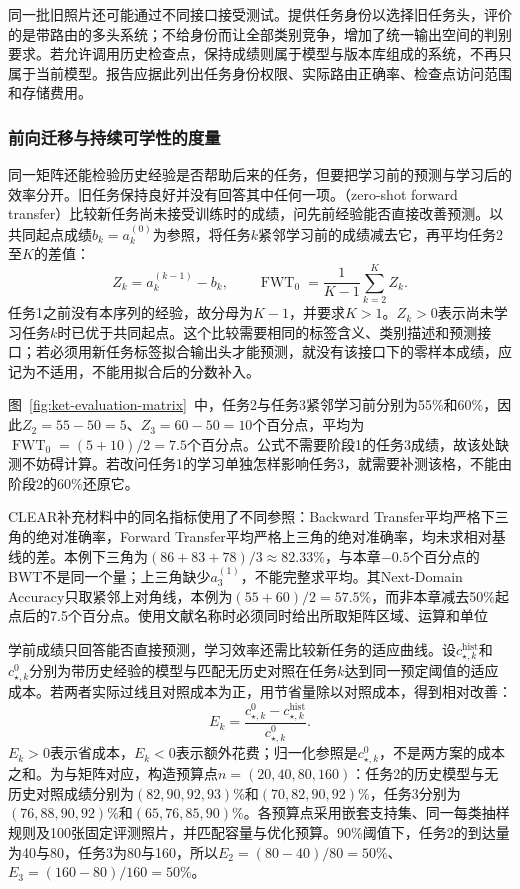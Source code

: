 同一批旧照片还可能通过不同接口接受测试。提供任务身份以选择旧任务头，评价的是带路由的多头系统；不给身份而让全部类别竞争，增加了统一输出空间的判别要求。若允许调用历史检查点，保持成绩则属于模型与版本库组成的系统，不再只属于当前模型。报告应据此列出任务身份权限、实际路由正确率、检查点访问范围和存储费用。

\subsubsection{前向迁移与持续可学性的度量}
\label{sec:ket-evaluation-forward}

同一矩阵还能检验历史经验是否帮助后来的任务，但要把学习前的预测与学习后的效率分开。旧任务保持良好并没有回答其中任何一项。（zero-shot forward transfer）比较新任务尚未接受训练时的成绩，问先前经验能否直接改善预测。以共同起点成绩$b_k=a_k^{(0)}$为参照，将任务$k$紧邻学习前的成绩减去它，再平均任务2至$K$的差值：
\begin{equation}
  Z_k=a_k^{(k-1)}-b_k,\qquad
  \operatorname{FWT}_0
  =\frac1{K-1}\sum_{k=2}^{K}Z_k.
  \label{eq:ket-evaluation-zero-forward}
\end{equation}
任务1之前没有本序列的经验，故分母为$K-1$，并要求$K>1$。$Z_k>0$表示尚未学习任务$k$时已优于共同起点。这个比较需要相同的标签含义、类别描述和预测接口；若必须用新任务标签拟合输出头才能预测，就没有该接口下的零样本成绩，应记为不适用，不能用拟合后的分数补入。

图~\ref{fig:ket-evaluation-matrix}~中，任务2与任务3紧邻学习前分别为55\%和60\%，因此$Z_2=55-50=5$、$Z_3=60-50=10$个百分点，平均为$\operatorname{FWT}_0=(5+10)/2=7.5$个百分点。公式不需要阶段1的任务3成绩，故该处缺测不妨碍计算。若改问任务1的学习单独怎样影响任务3，就需要补测该格，不能由阶段2的60\%还原它。

CLEAR补充材料中的同名指标使用了不同参照：Backward Transfer平均严格下三角的绝对准确率，Forward Transfer平均严格上三角的绝对准确率，均未求相对基线的差。本例下三角为$(86+83+78)/3\approx82.33\%$，与本章$-0.5$个百分点的BWT不是同一个量；上三角缺少$a_3^{(1)}$，不能完整求平均。其Next-Domain Accuracy只取紧邻上对角线，本例为$(55+60)/2=57.5\%$，而非本章减去50\%起点后的7.5个百分点。使用文献名称时必须同时给出所取矩阵区域、运算和单位

学前成绩只回答能否直接预测，学习效率还需比较新任务的适应曲线。设$c_{\star,k}^{\mathrm{hist}}$和$c_{\star,k}^{0}$分别为带历史经验的模型与匹配无历史对照在任务$k$达到同一预定阈值的适应成本。若两者实际过线且对照成本为正，用节省量除以对照成本，得到相对改善：
\begin{equation}
  E_k=\frac{c_{\star,k}^{0}-c_{\star,k}^{\mathrm{hist}}}
             {c_{\star,k}^{0}}.
  \label{eq:ket-evaluation-learning-cost-gain}
\end{equation}
$E_k>0$表示省成本，$E_k<0$表示额外花费；归一化参照是$c_{\star,k}^{0}$，不是两方案的成本之和。为与矩阵对应，构造预算点$n=(20,40,80,160)$：任务2的历史模型与无历史对照成绩分别为$(82,90,92,93)\%$和$(70,82,90,92)\%$，任务3分别为$(76,88,90,92)\%$和$(65,76,85,90)\%$。各预算点采用嵌套支持集、同一每类抽样规则及100张固定评测照片，并匹配容量与优化预算。90\%阈值下，任务2的到达量为40与80，任务3为80与160，所以$E_2=(80-40)/80=50\%$、$E_3=(160-80)/160=50\%$。

